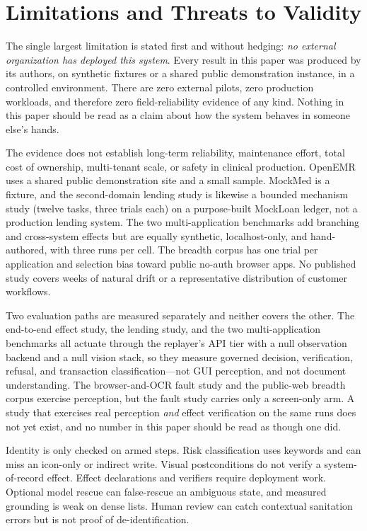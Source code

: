 \section{Limitations and Threats to Validity}
\label{sec:limits}

The single largest limitation is stated first and without hedging: \emph{no
external organization has deployed this system}. Every result in this paper was
produced by its authors, on synthetic fixtures or a shared public demonstration
instance, in a controlled environment. There are zero external pilots, zero
production workloads, and therefore zero field-reliability evidence of any kind.
Nothing in this paper should be read as a claim about how the system behaves in
someone else's hands.

The evidence does not establish long-term reliability, maintenance effort,
total cost of ownership, multi-tenant scale, or safety in clinical production.
OpenEMR uses a shared public demonstration site and a small sample. MockMed is a
fixture, and the second-domain lending study is likewise a bounded mechanism
study (twelve tasks, three trials each) on a purpose-built MockLoan ledger, not a
production lending system. The two multi-application benchmarks add branching
and cross-system effects but are equally synthetic, localhost-only, and
hand-authored, with three runs per cell. The breadth corpus has one trial per
application and selection bias toward public no-auth browser apps. No published
study covers weeks of natural drift or a representative distribution of customer
workflows.

Two evaluation paths are measured separately and neither covers the other. The
end-to-end effect study, the lending study, and the two multi-application
benchmarks all actuate through the replayer's API tier with a null observation
backend and a null vision stack, so they measure governed decision, verification,
refusal, and transaction classification---not GUI perception, and not document
understanding. The browser-and-OCR fault study and the public-web breadth corpus
exercise perception, but the fault study carries only a screen-only arm. A study
that exercises real perception \emph{and} effect verification on the same runs
does not yet exist, and no number in this paper should be read as though one
did.

Identity is only checked on armed steps. Risk classification uses keywords and
can miss an icon-only or indirect write. Visual postconditions do not verify a
system-of-record effect. Effect declarations and verifiers require deployment
work. Optional model rescue can false-rescue an ambiguous state, and measured
grounding is weak on dense lists. Human review can catch contextual sanitation
errors but is not proof of de-identification.

